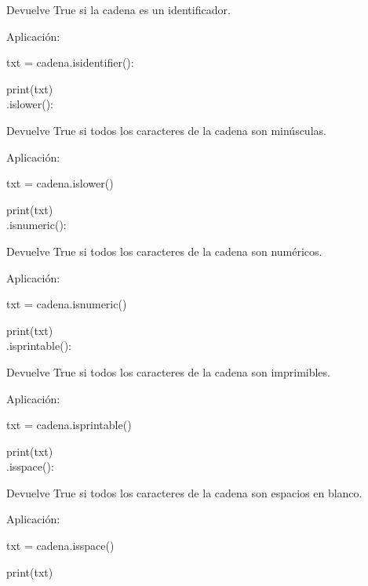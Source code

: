 {{\begin{minipage}{14cm}
{{{						{ \color{blue}		
							Devuelve True si la cadena es un identificador. }
						
						Aplicación: 
						
						txt = cadena.isidentifier(): 
						
						{\color{red!70!blue}print}(txt)\\
						
						
						
						.islower():  
						
						{\color{blue} 			
							Devuelve True si todos los caracteres de la cadena son minúsculas. }
						
						Aplicación: 
						
						txt = cadena.islower()
						
						{\color{red!70!blue}print}(txt)\\	
						
						.isnumeric(): 
						
						{ \color{blue} Devuelve True si todos los caracteres de la cadena son numéricos. }	
						
						Aplicación: 
						
						txt = cadena.isnumeric()
						
						{\color{red!70!blue}print}(txt)\\
						
						
						.isprintable():  
						
						{ \color{blue} Devuelve True si todos los caracteres de la cadena son imprimibles. }	
						
						Aplicación: 
						
						txt = cadena.isprintable()
						
						{\color{red!70!blue}print}(txt)\\
						
						
						
						.isspace(): 
						
						{ \color{blue} Devuelve True si todos los caracteres de la cadena son espacios en blanco. }
						
						Aplicación: 
						
						txt = cadena.isspace()
						
						{\color{red!70!blue}print}(txt)\\
						
						
						
						
						
			}}}
			
			
\end{minipage} }}









